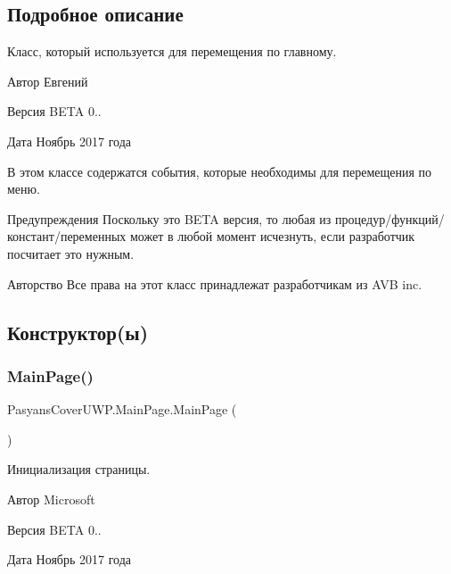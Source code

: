\subsection{Подробное описание}
Класс, который используется для перемещения по главному. 

\begin{DoxyAuthor}{Автор}
Евгений 
\end{DoxyAuthor}
\begin{DoxyVersion}{Версия}
B\+E\+TA 0.. 
\end{DoxyVersion}
\begin{DoxyDate}{Дата}
Ноябрь 2017 года
\end{DoxyDate}
В этом классе содержатся события, которые необходимы для перемещения по меню. \begin{DoxyWarning}{Предупреждения}
Поскольку это B\+E\+TA версия, то любая из процедур/функций/констант/переменных может в любой момент исчезнуть, если разработчик посчитает это нужным. 
\end{DoxyWarning}
\begin{DoxyCopyright}{Авторство}
Все права на этот класс принадлежат разработчикам из A\+VB inc. 
\end{DoxyCopyright}


\subsection{Конструктор(ы)}
\mbox{\label{class_pasyans_cover_u_w_p_1_1_main_page_ac20d310ee10e37d258daca7671c09aa7}} 
\subsubsection{\texorpdfstring{Main\+Page()}{MainPage()}}
{\footnotesize\ttfamily Pasyans\+Cover\+U\+W\+P.\+Main\+Page.\+Main\+Page (\begin{DoxyParamCaption}{ }\end{DoxyParamCaption})\hspace{0.3cm}{\ttfamily [inline]}}



Инициализация страницы. 

\begin{DoxyAuthor}{Автор}
Microsoft 
\end{DoxyAuthor}
\begin{DoxyVersion}{Версия}
B\+E\+TA 0.. 
\end{DoxyVersion}
\begin{DoxyDate}{Дата}
Ноябрь 2017 года 
\end{DoxyDate}


